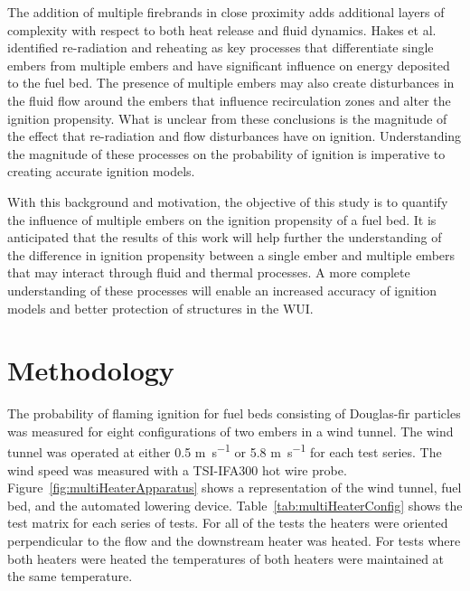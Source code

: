     The addition of multiple firebrands in close proximity adds additional layers of complexity with respect to both heat release and fluid dynamics.  Hakes et al.~\cite{Hakes2019a} identified re-radiation and reheating as key processes that differentiate single embers from multiple embers and have significant influence on energy deposited to the fuel bed.  The presence of multiple embers may also create disturbances in the fluid flow around the embers that influence recirculation zones and alter the ignition propensity. What is unclear from these conclusions is the magnitude of the effect that re-radiation and flow disturbances have on ignition. Understanding the magnitude of these processes on the probability of ignition is imperative to creating accurate ignition models. 
    
    With this background and motivation, the objective of this study is to quantify the influence of multiple embers on the ignition propensity of a fuel bed. It is anticipated that the results of this work will help further the understanding of the difference in ignition propensity between a single ember and multiple embers that may interact through fluid and thermal processes. A more complete understanding of these processes will enable an increased accuracy of ignition models and better protection of structures in the WUI.
    
    
\section{Methodology}
    The probability of flaming ignition for fuel beds consisting of Douglas-fir particles was measured for eight configurations of two embers in a wind tunnel. The wind tunnel was operated at either 0.5 \si{\meter\per\second} or 5.8 \si{\meter\per\second} for each test series. The wind speed was measured with a TSI-IFA300 hot wire probe. Figure~\ref{fig:multiHeaterApparatus} shows a representation of the wind tunnel, fuel bed, and the automated lowering device. Table~\ref{tab:multiHeaterConfig} shows the test matrix for each series of tests. For all of the tests the heaters were oriented perpendicular to the flow and the downstream heater was heated. For tests where both heaters were heated the temperatures of both heaters were maintained at the same temperature. 
    
